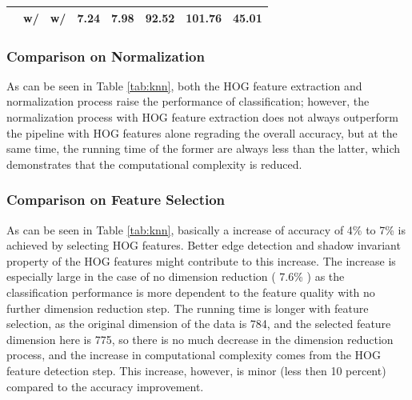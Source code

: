 \documentclass[12pt]{article}
\begin{document}
\begin{table}[]
{\begin{tabular}{@{}cccccccc@{}}
                                                                                                    & w/                             & w/                                                                     & 7.24                                                                                 & 7.98   & 92.52      & 101.76   & 45.01                                                                                       \\ \bottomrule
\end{tabular}
}
\end{table}

\subsubsection{Comparison on Normalization}
As can be seen in Table \ref{tab:knn}, both the HOG feature extraction and normalization process raise the performance of classification; however, the normalization process with HOG feature extraction does not always outperform the pipeline with HOG features alone regrading the overall accuracy, but at the same time, the running time of the former are always less than the latter, which demonstrates that the computational complexity is reduced. 

\subsubsection{Comparison on Feature Selection}
As can be seen in Table \ref{tab:knn}, basically a increase of accuracy of 4\% to 7\% is achieved by selecting HOG features. Better edge detection and shadow invariant property of the HOG features might contribute to this increase. The increase is especially large in the case of no dimension reduction ( 7.6\% ) as the classification performance is more dependent to the feature quality with no further dimension reduction step.
The running time is longer with feature selection, as the original dimension of the data is 784, and the selected feature dimension here is 775, so there is no much decrease in the dimension reduction process, and the increase in computational complexity comes from the HOG feature detection step. This increase, however, is minor (less then 10 percent) compared to the accuracy improvement.
\end{document}
